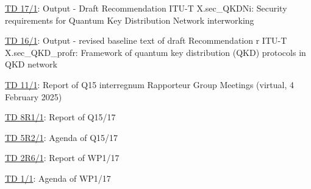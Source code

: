 \href{https://www.itu.int/md/meetingdoc.asp?lang=en\&parent=T25-SG17-250408-TD-WP1-0017}{TD 17/1}: Output - Draft Recommendation ITU-T X.sec\_QKDNi: Security requirements for Quantum Key Distribution Network interworking

\href{https://www.itu.int/md/meetingdoc.asp?lang=en\&parent=T25-SG17-250408-TD-WP1-0016}{TD 16/1}: Output - revised baseline text of draft Recommendation r ITU-T X.sec\_QKD\_profr: Framework of quantum key distribution (QKD) protocols in QKD network

\href{https://www.itu.int/md/meetingdoc.asp?lang=en\&parent=T25-SG17-250408-TD-WP1-0011}{TD 11/1}: Report of Q15  interregnum Rapporteur Group Meetings (virtual, 4 February 2025)    

\href{https://www.itu.int/md/meetingdoc.asp?lang=en\&parent=T25-SG17-250408-TD-WP1-0008}{TD 8R1/1}: Report of Q15/17    

\href{https://www.itu.int/md/meetingdoc.asp?lang=en\&parent=T25-SG17-250408-TD-WP1-0005}{TD 5R2/1}: Agenda of Q15/17    

\href{https://www.itu.int/md/meetingdoc.asp?lang=en\&parent=T25-SG17-250408-TD-WP1-0002}{TD 2R6/1}: Report of  WP1/17

\href{https://www.itu.int/md/meetingdoc.asp?lang=en\&parent=T25-SG17-250408-TD-WP1-0001}{TD 1/1}: Agenda of WP1/17
